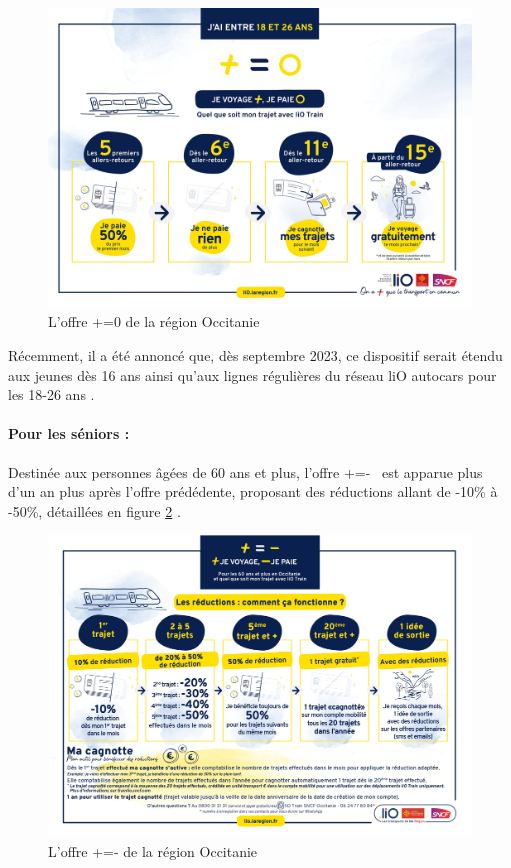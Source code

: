 \documentclass[a4paper]{article}
\begin{document}
\begin{figure}
  \centering
  \includegraphics[width=\textwidth]{illustrations/images/offres/occitanie/plus_eq_zero.jpg}
  \caption{L'offre +=0 de la région Occitanie}
  \label{fig:plus_eq_zero}
\end{figure}


Récemment, il a été annoncé que, dès septembre 2023, ce dispositif serait étendu aux jeunes
dès 16 ans ainsi qu'aux lignes régulières du réseau liO autocars pour les
18-26 ans \cite{nouvelle-convention}.



\paragraph{Pour les séniors : }
Destinée aux personnes âgées de 60 ans et plus, l'offre \og +=- \fg\ est apparue plus d'un an plus après l'offre prédédente,
proposant des réductions allant de -10\% à -50\%, détaillées en figure \ref*{fig:plus_eq_moins}
\cite{plus_eq_moins}.

\begin{figure}
  \centering
  \includegraphics[width=\textwidth]{illustrations/images/offres/occitanie/plus_egal_moins/reductions.jpg}
  \caption{L'offre +=- de la région Occitanie \cite{plus_eq_moins}}
  \label{fig:plus_eq_moins}
\end{figure}
\end{document}

